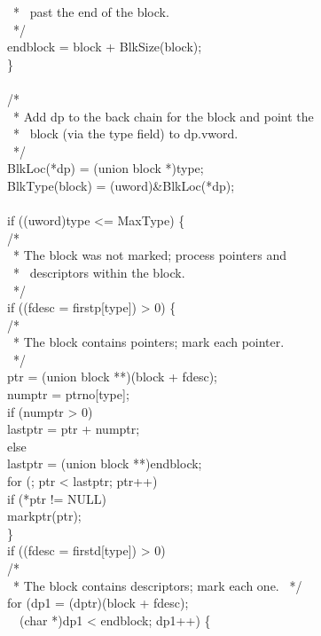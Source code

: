 {\>\>\>\ * \ past the end of the block.\\
\>\>\>\ */\\
\>\>\>endblock = block + BlkSize(block);\\
\>\>\>\}\\
\\
\>\>/*\\
\>\>\ * Add dp to the back chain for the block and point the\\
\>\>\ * \ block (via the type field) to dp.vword.\\
\>\>\ */\\
\>\>BlkLoc(*dp) = (union block *)type;\\
\>\>BlkType(block) = (uword)\&BlkLoc(*dp);\\
\\
\>\>if ((uword)type <= MaxType) \{\\
\>\>\>/*\\
\>\>\>\ * The block was not marked; process pointers and\\
\>\>\>\ * \ descriptors within the block.\\
\>\>\>\ */\\
\>\>\>if ((fdesc = firstp[type]) > 0) \{\\
\>\>\>\>/*\\
\>\>\>\>\ * The block contains pointers; mark each pointer.\\
\>\>\>\>\ */\\
\>\>\>\>ptr = (union block **)(block + fdesc);\\
\>\>\>\>numptr = ptrno[type];\\
\>\>\>\>if (numptr > 0)\\
\>\>\>\>\>lastptr = ptr + numptr;\\
\>\>\>\>else\\
\>\>\>\>\>lastptr = (union block **)endblock;\\
\>\>\>\>for (; ptr < lastptr; ptr++)\\
\>\>\>\>\>if (*ptr != NULL)\\
\>\>\>\>\>\>markptr(ptr);\\
\>\>\>\>\}\\
\>\>\>if ((fdesc = firstd[type]) > 0)\\
\>\>\>\>/*\\
\>\>\>\>\ * The block contains descriptors; mark each one. 
\>\>\>\>\ */\\
\>\>\>\>for (dp1 = (dptr)(block + fdesc);\\
\>\>\>\>\>\ \ (char *)dp1 < endblock; dp1++) \{\\
}
